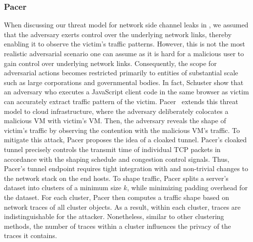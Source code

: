 \subsubsection{Pacer}\label{subsubsec:background-defenses-pacer}
When discussing our threat model for network side channel leaks in , we assumed that the adversary exerts control over the underlying network links, thereby enabling it to observe the victim's traffic patterns.
However, this is not the most realistic adversarial scenario one can assume as it is hard for a malicious user to gain control over underlying network links.
Consequently, the scope for adversarial actions becomes restricted primarily to entities of substantial scale such as large corporations and governmental bodies.
In fact, Schuster show that an adversary who executes a JavaScript client code in the same browser as victim can accurately extract traffic pattern of the victim.
Pacer~\cite{mehta2022pacer} extends this threat model to cloud infrastructure, where the adversary deliberately colocates a malicious VM with victim's VM.
Then, the adversary reveals the shape of victim's traffic by observing the contention with the malicious VM's traffic.
To mitigate this attack, Pacer \cite{mehta2022pacer} proposes the idea of a cloaked tunnel.
Pacer's cloaked tunnel precisely controls the transmit time of individual
TCP packets in accordance with the shaping schedule and congestion control
signals.
Thus, Pacer's tunnel endpoint requires tight integration with and
non-trivial changes to the network stack on the end hosts.
To shape traffic, Pacer splits a server's dataset into clusters of a minimum size $k$, while minimizing padding overhead for the dataset.
For each cluster, Pacer then computes a traffic shape based on network traces of all cluster objects.
As a result, within each cluster, traces are indistinguishable for the attacker. 
Nonetheless, similar to other clustering methods, the number of traces within a cluster influences the privacy of the traces it contains.


